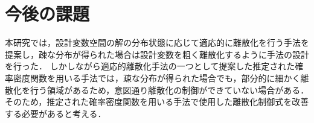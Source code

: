 \documentclass[../main/main]{subfiles}
\begin{document}
%
%


\section{今後の課題}
\quad 本研究では，設計変数空間の解の分布状態に応じて適応的に離散化を行う手法を提案し，疎な分布が得られた場合は設計変数を粗く離散化するように手法の設計を行った．
しかしながら適応的離散化手法の一つとして提案した推定された確率密度関数を用いる手法では，疎な分布が得られた場合でも，部分的に細かく離散化を行う領域があるため，意図通り離散化の制御ができていない場合がある．
そのため，推定された確率密度関数を用いる手法で使用した離散化制御式を改善する必要があると考える．
\end{document}

